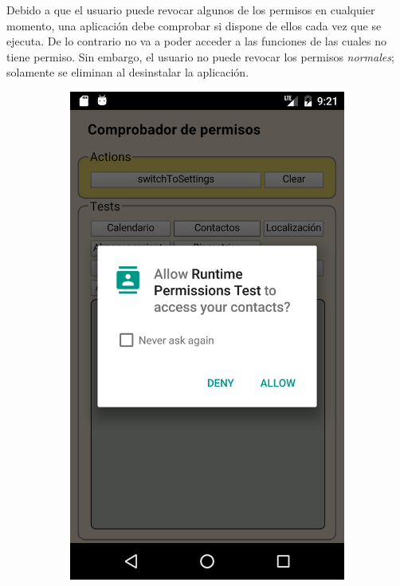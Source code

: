 Debido a que el usuario puede revocar algunos de los permisos en cualquier momento, una aplicación debe comprobar si dispone de ellos cada vez que se ejecuta. De lo contrario no va a poder acceder a las funciones de las cuales no tiene permiso. Sin embargo, el usuario no puede revocar los permisos \emph{normales}; solamente se eliminan al desinstalar la aplicación.
\begin{figure}[btp]
    \centering
    \begin{subfigure}{0.28\linewidth}
        \includegraphics[width=\linewidth]{imgs/chapter5/allow_contact}

\end{subfigure}
\end{figure}
